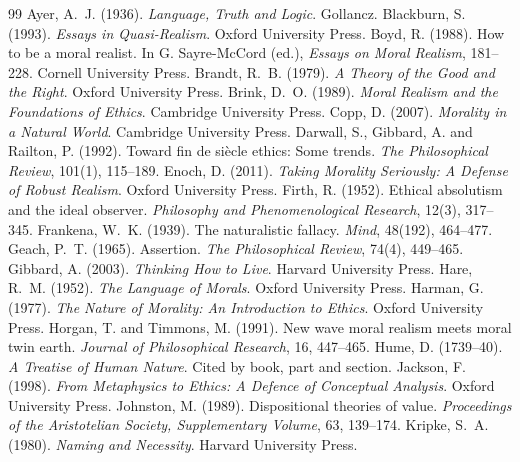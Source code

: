\documentclass{situationist-preprint}
\begin{document}
\begin{thebibliography}{99}\small
{} Ayer, A.~J. (1936). \emph{Language, Truth and Logic}. Gollancz.
 Blackburn, S. (1993). \emph{Essays in Quasi-Realism}. Oxford University Press.
 Boyd, R. (1988). How to be a moral realist. In G. Sayre-McCord (ed.), \emph{Essays on Moral Realism}, 181--228. Cornell University Press.
 Brandt, R.~B. (1979). \emph{A Theory of the Good and the Right}. Oxford University Press.
 Brink, D.~O. (1989). \emph{Moral Realism and the Foundations of Ethics}. Cambridge University Press.
 Copp, D. (2007). \emph{Morality in a Natural World}. Cambridge University Press.
 Darwall, S., Gibbard, A. and Railton, P. (1992). Toward fin de si\`ecle ethics: Some trends. \emph{The Philosophical Review}, 101(1), 115--189.
 Enoch, D. (2011). \emph{Taking Morality Seriously: A Defense of Robust Realism}. Oxford University Press.
 Firth, R. (1952). Ethical absolutism and the ideal observer. \emph{Philosophy and Phenomenological Research}, 12(3), 317--345.
 Frankena, W.~K. (1939). The naturalistic fallacy. \emph{Mind}, 48(192), 464--477.
 Geach, P.~T. (1965). Assertion. \emph{The Philosophical Review}, 74(4), 449--465.
 Gibbard, A. (2003). \emph{Thinking How to Live}. Harvard University Press.
 Hare, R.~M. (1952). \emph{The Language of Morals}. Oxford University Press.
 Harman, G. (1977). \emph{The Nature of Morality: An Introduction to Ethics}. Oxford University Press.
 Horgan, T. and Timmons, M. (1991). New wave moral realism meets moral twin earth. \emph{Journal of Philosophical Research}, 16, 447--465.
 Hume, D. (1739--40). \emph{A Treatise of Human Nature}. Cited by book, part and section.
 Jackson, F. (1998). \emph{From Metaphysics to Ethics: A Defence of Conceptual Analysis}. Oxford University Press.
 Johnston, M. (1989). Dispositional theories of value. \emph{Proceedings of the Aristotelian Society, Supplementary Volume}, 63, 139--174.
 Kripke, S.~A. (1980). \emph{Naming and Necessity}. Harvard University Press.

\end{thebibliography}
\end{document}
